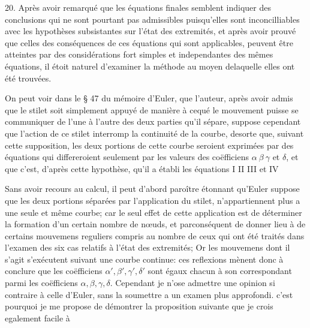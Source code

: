 \documentclass[11pt,a4paper]{article}
\begin{document}

20. Après avoir remarqué que les équations finales semblent indiquer des conclusions
qui ne sont pourtant pas admissibles puisqu'elles sont inconcilliables avec les
hypothèses subsistantes sur l'état des extremités, et après avoir prouvé que celles
des conséquences de ces équations qui sont applicables, peuvent être atteintes par
des considérations fort simples et independantes des mêmes équations, il étoit
naturel d'examiner la méthode au moyen delaquelle elles ont été trouvées.

On peut voir dans le § 47 \struck{\ill{}} du mémoire d'Euler, que l'auteur,
après avoir admis que le stilet soit simplement appuyé de manière à cequé
le mouvement puisse se communiquer de l'une à l'autre des deux parties
qu'il sépare, suppose cependant que l'action de ce stilet interromp la
continuité de la courbe, desorte que, suivant cette supposition, les deux
portions de cette courbe seroient exprimées par des équations qui differeroient
seulement par les valeurs des coëfficiens $\alpha\ \beta\ \gamma$ et $\delta$, et que c'est, d'après cette
hypothèse, qu'il a établi les équations I II III et IV

Sans avoir recours au calcul, il peut d'abord paroître étonnant qu'Euler
suppose que les deux portions séparées par l'application du stilet, n'appartiennent
plus a une seule et même courbe; car le seul effet de cette application
est de déterminer la formation d'un certain nombre de nœuds, et parconséquent
de donner lieu à de certains mouvemens reguliers compris au nombre de
ceux qui ont été traités dans l'examen des six cas relatifs à l'état des
extremités; Or les mouvemens dont il s'agit s'exécutent suivant une courbe
continue: ces reflexions mènent donc à conclure que les coëfficiens $\alpha', \beta', \gamma', \delta'$
sont égaux chacun à son correspondant parmi les coëfficiens $\alpha, \beta, \gamma, \delta$.
Cependant je n'ose admettre une opinion si contraire à celle d'Euler, sans
la soumettre a un examen plus approfondi. c'est pourquoi je me propose
de démontrer la proposition suivante que je crois egalement facile à
\end{document}
